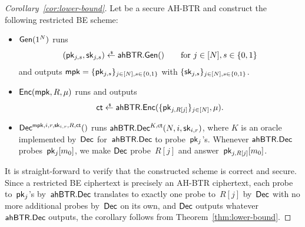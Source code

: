 \begin{proof}
[%
Corollary~\ref{cor:lower-bound}]
Let
be a secure AH-BTR and
construct the following restricted BE scheme:
\begin{itemize}
\item $\Gen(1^N)$ runs
\begin{align*}
(\pk_{j,s},\sk_{j,s})\draws\AHBTR.\Gen()\qquad\textup{for }j\in[N],s\in\bit
\end{align*}
and outputs ${\mpk=\{\pk_{j,s}\}_{j\in[N],s\in\bit}}$ with $\{\sk_{j,s}\}_{j\in[N],s\in\bit}$.
\item $\Enc(\mpk,R,\mu)$ runs and outputs
\begin{align*}
\ct\draws\AHBTR.\Enc(\{\pk_{j,R[j]}\}_{j\in[N]},\mu).
\end{align*}
\item $\Dec^{\mpk,i,r,\sk_{i,r},R,\ct}()$
runs $\AHBTR.\Dec^{K,\ct}(N,i,\sk_{i,r})$,
where $K$ is an oracle implemented by~$\Dec$ for~$\AHBTR.\Dec$ to probe~$\pk_j$'s.
Whenever $\AHBTR.\Dec$ probes~$\pk_j[m_0]$,
we make $\Dec$ probe~$R[j]$ and answer~$\pk_{j,R[j]}[m_0]$.
\end{itemize}
It is straight-forward to verify that the constructed scheme is correct and secure.
Since
a restricted BE ciphertext is precisely an AH-BTR ciphertext,
each probe to~$\pk_j$'s by~$\AHBTR.\Dec$ translates to exactly one probe to~$R[j]$ by~$\Dec$ with no more additional probes by~$\Dec$ on its own, and
$\Dec$ outputs whatever $\AHBTR.\Dec$ outputs,
the corollary follows from Theorem~\ref{thm:lower-bound}.
\end{proof}
